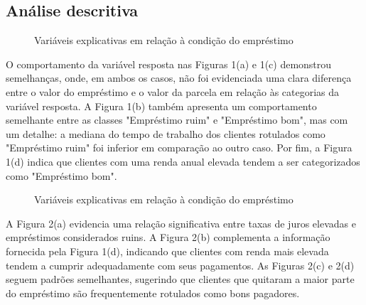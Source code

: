\subsection*{Análise descritiva}


\begin{figure}[H]
  \centering
  \vspace{.5cm}
  \vspace{.5cm}
  
  \label{fig:exp_boxplot1}
  \caption{Variáveis explicativas em relação à condição do empréstimo}
  
\end{figure}

O comportamento da variável resposta nas Figuras 1(a) e 1(c) demonstrou semelhanças, onde, em ambos os casos,
não foi evidenciada uma clara diferença entre o valor do empréstimo e o valor da parcela em relação às
categorias da variável resposta. A Figura 1(b) também apresenta um comportamento semelhante entre as classes
"Empréstimo ruim" e "Empréstimo bom", mas com um detalhe: a mediana do tempo de trabalho dos clientes rotulados 
como "Empréstimo ruim" foi inferior em comparação ao outro caso. Por fim, a Figura 1(d) indica que clientes 
com uma renda anual elevada tendem a ser categorizados como "Empréstimo bom".


\begin{figure}[H]
  \centering
  \vspace{.5cm}
  \vspace{.5cm}
 \caption{Variáveis explicativas em relação à condição do empréstimo}
  
 \label{fig:exp_boxplot2}
\end{figure}

A Figura 2(a) evidencia uma relação significativa entre taxas de juros elevadas e empréstimos 
considerados ruins. A Figura 2(b) complementa a informação fornecida pela Figura 1(d),
indicando que clientes com renda mais elevada tendem a cumprir adequadamente com seus pagamentos.
As Figuras 2(c) e 2(d) seguem padrões semelhantes, sugerindo que clientes que quitaram a 
maior parte do empréstimo são frequentemente rotulados como bons pagadores.


